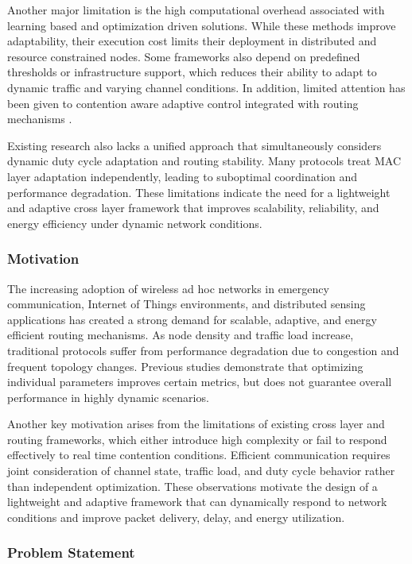 \documentclass[a4paper,fleqn,final,1p]{cas-dc}
\numberwithin{equation}{section}
\begin{document}
Another major limitation is the high computational overhead associated with learning based and optimization driven solutions. While these methods improve adaptability, their execution cost limits their deployment in distributed and resource constrained nodes. Some frameworks also depend on predefined thresholds or infrastructure support, which reduces their ability to adapt to dynamic traffic and varying channel conditions. In addition, limited attention has been given to contention aware adaptive control integrated with routing mechanisms \cite{Aluri2025707,Ghourab20252011}.

Existing research also lacks a unified approach that simultaneously considers dynamic duty cycle adaptation and routing stability. Many protocols treat MAC layer adaptation independently, leading to suboptimal coordination and performance degradation. These limitations indicate the need for a lightweight and adaptive cross layer framework that improves scalability, reliability, and energy efficiency under dynamic network conditions.

\subsubsection{Motivation}

The increasing adoption of wireless ad hoc networks in emergency communication, Internet of Things environments, and distributed sensing applications has created a strong demand for scalable, adaptive, and energy efficient routing mechanisms. As node density and traffic load increase, traditional protocols suffer from performance degradation due to congestion and frequent topology changes. Previous studies demonstrate that optimizing individual parameters improves certain metrics, but does not guarantee overall performance in highly dynamic scenarios.

Another key motivation arises from the limitations of existing cross layer and routing frameworks, which either introduce high complexity or fail to respond effectively to real time contention conditions. Efficient communication requires joint consideration of channel state, traffic load, and duty cycle behavior rather than independent optimization. These observations motivate the design of a lightweight and adaptive framework that can dynamically respond to network conditions and improve packet delivery, delay, and energy utilization.

\subsubsection{Problem Statement}
\end{document}
